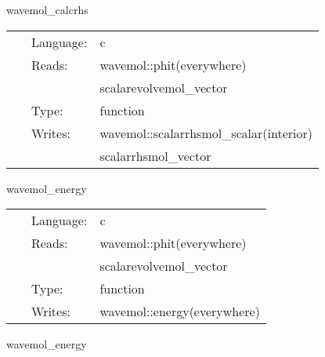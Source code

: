 \vspace{5mm}


\hspace{5mm} wavemol\_calcrhs 

\hspace{5mm}{\it register rhs calculation for mol } 


\hspace{5mm}

 \begin{tabular*}{160mm}{cll} 
~ & Language:  & c \\ 
~ & Reads:  & wavemol::phit(everywhere) \\ 
~& ~ &scalarevolvemol\_vector\\ 
~ & Type:  & function \\ 
~ & Writes:  & wavemol::scalarrhsmol\_scalar(interior) \\ 
~& ~ &scalarrhsmol\_vector\\ 
\end{tabular*} 


\vspace{5mm}


\hspace{5mm} wavemol\_energy 

\hspace{5mm}{\it calculate the energy } 


\hspace{5mm}

 \begin{tabular*}{160mm}{cll} 
~ & Language:  & c \\ 
~ & Reads:  & wavemol::phit(everywhere) \\ 
~& ~ &scalarevolvemol\_vector\\ 
~ & Type:  & function \\ 
~ & Writes:  & wavemol::energy(everywhere) \\ 
\end{tabular*} 


\vspace{5mm}


\hspace{5mm} wavemol\_energy 

\hspace{5mm}{\it calculate the energy } 


\hspace{5mm}

